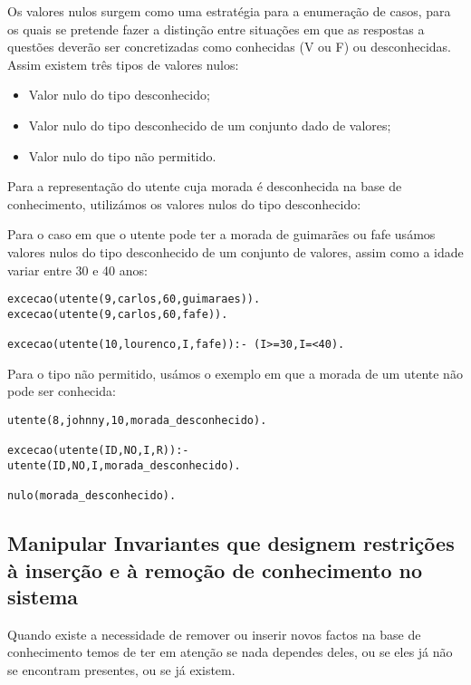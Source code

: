 Os valores nulos surgem como uma estratégia para a enumeração de casos, para os quais se pretende fazer a distinção entre situações em que as respostas a questões deverão ser concretizadas como conhecidas (V ou F) ou desconhecidas. 
Assim existem três tipos de valores nulos:

\begin{itemize}
	\item Valor nulo do tipo desconhecido;	
	\item Valor nulo do tipo desconhecido de um conjunto dado de valores;
	\item Valor nulo do tipo não permitido. 
\end{itemize}

Para a representação do utente cuja morada é desconhecida na base de conhecimento, utilizámos os valores nulos do tipo desconhecido: 



Para o caso em que o utente pode ter a morada de guimarães ou fafe  usámos valores nulos do tipo desconhecido de um conjunto de valores, assim como a idade variar entre 30 e 40 anos: 

\begin{Verbatim}
excecao(utente(9,carlos,60,guimaraes)).
excecao(utente(9,carlos,60,fafe)).

excecao(utente(10,lourenco,I,fafe)):- (I>=30,I=<40).	
\end{Verbatim}

Para o tipo não permitido, usámos o exemplo em que a morada de um utente não pode ser conhecida: 

\begin{verbatim}
utente(8,johnny,10,morada_desconhecido).

excecao(utente(ID,NO,I,R)):- 
utente(ID,NO,I,morada_desconhecido).

nulo(morada_desconhecido).
\end{verbatim}


\subsection{Manipular Invariantes que designem restrições à inserção e à remoção de conhecimento no sistema}

Quando existe a necessidade de remover ou inserir novos factos na base de conhecimento temos de ter em atenção se nada dependes deles, ou se eles já não se encontram presentes, ou se já existem. 

